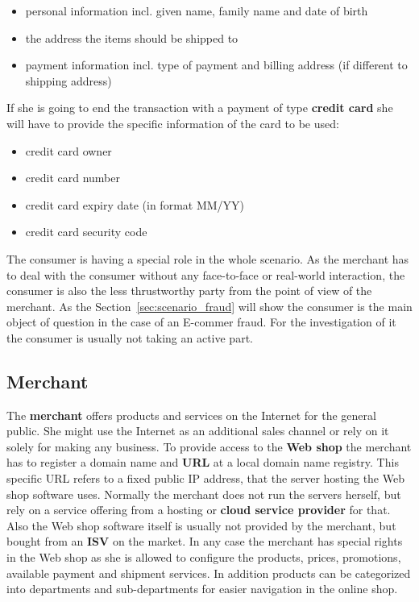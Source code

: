 \begin{itemize}
		\item personal information incl. given name, family name and date of birth
		\item the address the items should be shipped to
		\item payment information incl. type of payment and billing address (if different to shipping address)
\end{itemize}

If she is going to end the transaction with a payment of type \textbf{credit card} she will have to provide the specific information of the card to be used:\@

\begin{itemize}
		\item credit card owner
		\item credit card number
		\item credit card expiry date (in format MM/YY)
		\item credit card security code
\end{itemize}

The consumer is having a special role in the whole scenario. As the merchant has to deal with the consumer without any face-to-face or real-world interaction, the consumer is also the less thrustworthy party from the point of view of the merchant. As the Section~\ref{sec:scenario_fraud} will show the consumer is the main object of question in the case of an E-commer fraud. For the investigation of it the consumer is usually not taking an active part.


\subsection{Merchant}
\label{subsec:stakeholder_merchant}

The \textbf{merchant} offers products and services on the Internet for the general public. She might use the Internet as an additional sales channel or rely on it solely for making any business. To provide access to the \textbf{Web shop} the merchant has to register a domain name and \textbf{\gls{URL}} at a local domain name registry. This specific \gls{URL} refers to a fixed public \gls{IP} address, that the server hosting the Web shop software uses. Normally the merchant does not run the servers herself, but rely on a service offering from a hosting or \textbf{cloud service provider} for that. Also the Web shop software itself is usually not provided by the merchant, but bought from an \textbf{\gls{ISV}} on the market. In any case the merchant has special rights in the Web shop as she is allowed to configure the products, prices, promotions, available payment and shipment services. In addition products can be categorized into departments and sub-departments for easier navigation in the online shop. \\

